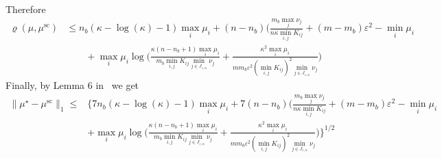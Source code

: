 \documentclass{article}
\newcommand{\norm}[1]{\|#1\|}
\begin{document}
Therefore
\begin{align*}
\varrho({\mu},{\mu}^{\text{sc}}) &\leq n_b(\kappa-\log(\kappa)-1)\max_{i} \mu_i + (n-n_b)\bigg(\frac{m_b\max_{j}\nu_j}{n\kappa\min_{i,j} K_{ij}} + (m- m_b) \varepsilon^2 - \min_{i}\mu_i\\
&\qquad + \max_{i} \mu_i\log\Big(\frac{\kappa(n-n_b+ 1)\max_{i} \mu_i}{m_b\min_{i,j}K_{ij}\min_{j \in J_{\varepsilon,\kappa}}\nu_j} + \frac{\kappa^2\max_{i} \mu_i}{mm_b\varepsilon^2(\min_{i,j}K_{ij})^2\min_{j \in J_{\varepsilon,\kappa}}\nu_j}\Big)
\end{align*}
Finally, by Lemma 6 in~\cite{altschulernips17} we get 
\begin{align*}
\norm{{\mu}^\star -{\mu}^{\text{sc}}}_1 \leq &\bigg\{7n_b(\kappa-\log(\kappa)-1)\max_{i} \mu_i + 7(n-n_b)\bigg(\frac{m_b\max_{j}\nu_j}{n\kappa\min_{i,j} K_{ij}} + (m- m_b) \varepsilon^2 - \min_{i}\mu_i\\
&+ \max_{i} \mu_i\log\Big(\frac{\kappa(n-n_b+ 1)\max_{i} \mu_i}{m_b\min_{i,j}K_{ij}\min_{j \in J_{\varepsilon,\kappa}}\nu_j} + \frac{\kappa^2\max_{i} \mu_i}{mm_b\varepsilon^2(\min_{i,j}K_{ij})^2\min_{j \in J_{\varepsilon,\kappa}}\nu_j}\Big)\bigg\}^{1/2}
\end{align*}


\small


\end{document}
